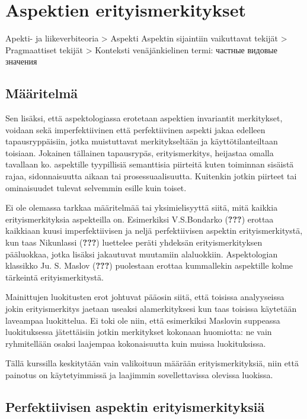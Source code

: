 \documentclass[finnish,russian,]{article}
\author{}
\date{}
\begin{document}
\section{Aspektien
erityismerkitykset}\label{aspektien-erityismerkitykset}

Apekti- ja liikeverbiteoria \textgreater{} Aspekti Aspektin sijaintiin
vaikuttavat tekijät \textgreater{} Pragmaattiset tekijät \textgreater{}
Konteksti venäjänkielinen termi: частные видовые значения

\subsection{Määritelmä}\label{muxe4uxe4ritelmuxe4}

Sen lisäksi, että aspektologiassa erotetaan aspektien invariantit
merkitykset, voidaan sekä imperfektiivinen että perfektiivinen aspekti
jakaa edelleen tapausryppäisiin, jotka muistuttavat merkitykseltään ja
käyttötilanteiltaan toisiaan. Jokainen tällainen tapausrypäs,
erityismerkitys, heijastaa omalla tavallaan ko. aspektille tyypillisiä
semanttisia piirteitä kuten toiminnan sisäistä rajaa, sidonnaisuutta
aikaan tai prosessuaalisuutta. Kuitenkin jotkin piirteet tai
ominaisuudet tulevat selvemmin esille kuin toiset.

Ei ole olemassa tarkkaa määritelmää tai yksimielisyyttä siitä, mitä
kaikkia erityismerkityksia aspekteilla on. Esimerkiksi V.S.Bondarko
({\textbf{???}}) erottaa kaikkiaan kuusi imperfektiivisen ja neljä
perfektiivisen aspektin erityismerkitystä, kun taas Nikunlassi
({\textbf{???}}) luettelee peräti yhdeksän erityismerkityksen
pääluokkaa, jotka lisäksi jakautuvat muutamiin alaluokkiin.
Aspektologian klassikko Ju. S. Maslov ({\textbf{???}}) puolestaan
erottaa kummallekin aspektille kolme tärkeintä erityismerkitystä.

Mainittujen luokitusten erot johtuvat pääosin siitä, että toisissa
analyyseissa jokin erityismerkitys jaetaan useaksi alamerkityksesi kun
taas toisissa käytetään laveampaa luokittelua. Ei toki ole niin, että
esimerkiksi Maslovin suppeassa luokituksessa jätettäisiin jotkin
merkitykset kokonaan huomiotta: ne vain ryhmitellään osaksi laajempaa
kokonaisuutta kuin muissa luokituksissa.

Tällä kurssilla keskitytään vain valikoituun määrään erityismerkityksiä,
niin että painotus on käytetyimmissä ja laajimmin sovellettavissa
olevissa luokissa.

\subsection{Perfektiivisen aspektin
erityismerkityksiä}\label{perfektiivisen-aspektin-erityismerkityksiuxe4}
\end{document}
